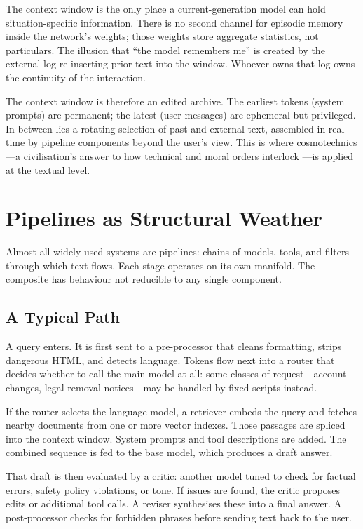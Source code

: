 \documentclass[12pt,a4paper]{article}
\begin{document}
The context window is the only place a current-generation model can hold situation-specific information. There is no second channel for episodic memory inside the network's weights; those weights store aggregate statistics, not particulars. The illusion that ``the model remembers me'' is created by the external log re-inserting prior text into the window. Whoever owns that log owns the continuity of the interaction.

The context window is therefore an edited archive. The earliest tokens (system prompts) are permanent; the latest (user messages) are ephemeral but privileged. In between lies a rotating selection of past and external text, assembled in real time by pipeline components beyond the user's view. This is where cosmotechnics---a civilisation's answer to how technical and moral orders interlock \cite{hui2020}---is applied at the textual level.

\section{Pipelines as Structural Weather}

Almost all widely used systems are pipelines: chains of models, tools, and filters through which text flows. Each stage operates on its own manifold. The composite has behaviour not reducible to any single component.

\subsection{A Typical Path}

A query enters. It is first sent to a pre-processor that cleans formatting, strips dangerous HTML, and detects language. Tokens flow next into a router that decides whether to call the main model at all: some classes of request---account changes, legal removal notices---may be handled by fixed scripts instead.

If the router selects the language model, a retriever embeds the query and fetches nearby documents from one or more vector indexes. Those passages are spliced into the context window. System prompts and tool descriptions are added. The combined sequence is fed to the base model, which produces a draft answer.

That draft is then evaluated by a critic: another model tuned to check for factual errors, safety policy violations, or tone. If issues are found, the critic proposes edits or additional tool calls. A reviser synthesises these into a final answer. A post-processor checks for forbidden phrases before sending text back to the user.
\end{document}
